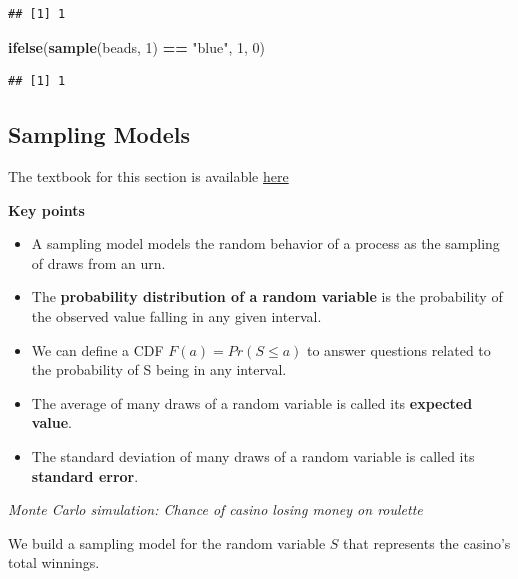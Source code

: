 \documentclass[
]{article}
\newenvironment{Shaded}{\begin{snugshade}}{\end{snugshade}}
\newcommand{\DecValTok}[1]{\textcolor[rgb]{0.00,0.00,0.81}{#1}}
\newcommand{\KeywordTok}[1]{\textcolor[rgb]{0.13,0.29,0.53}{\textbf{#1}}}
\newcommand{\NormalTok}[1]{#1}
\newcommand{\OperatorTok}[1]{\textcolor[rgb]{0.81,0.36,0.00}{\textbf{#1}}}
\newcommand{\StringTok}[1]{\textcolor[rgb]{0.31,0.60,0.02}{#1}}
\providecommand{\tightlist}{%
  \setlength{\itemsep}{0pt}\setlength{\parskip}{0pt}}
\begin{document}
\begin{verbatim}
## [1] 1
\end{verbatim}

\begin{Shaded}
\begin{Highlighting}[]
\KeywordTok{ifelse}\NormalTok{(}\KeywordTok{sample}\NormalTok{(beads, }\DecValTok{1}\NormalTok{) }\OperatorTok{==}\StringTok{ "blue"}\NormalTok{, }\DecValTok{1}\NormalTok{, }\DecValTok{0}\NormalTok{)}
\end{Highlighting}
\end{Shaded}

\begin{verbatim}
## [1] 1
\end{verbatim}

\hypertarget{sampling-models}{%
\subsection{Sampling Models}\label{sampling-models}}

The textbook for this section is available
\href{https://rafalab.github.io/dsbook/random-variables.html\#sampling-models}{here}

\textbf{Key points}

\begin{itemize}
\tightlist
\item
  A sampling model models the random behavior of a process as the
  sampling of draws from an urn.
\item
  The \textbf{probability distribution of a random variable} is the
  probability of the observed value falling in any given interval.
\item
  We can define a CDF \(F(a) = Pr(S \le a)\) to answer questions related
  to the probability of S being in any interval.
\item
  The average of many draws of a random variable is called its
  \textbf{expected value}.
\item
  The standard deviation of many draws of a random variable is called
  its \textbf{standard error}.
\end{itemize}

\emph{Monte Carlo simulation: Chance of casino losing money on roulette}

We build a sampling model for the random variable \(S\) that represents
the casino's total winnings.
\end{document}
